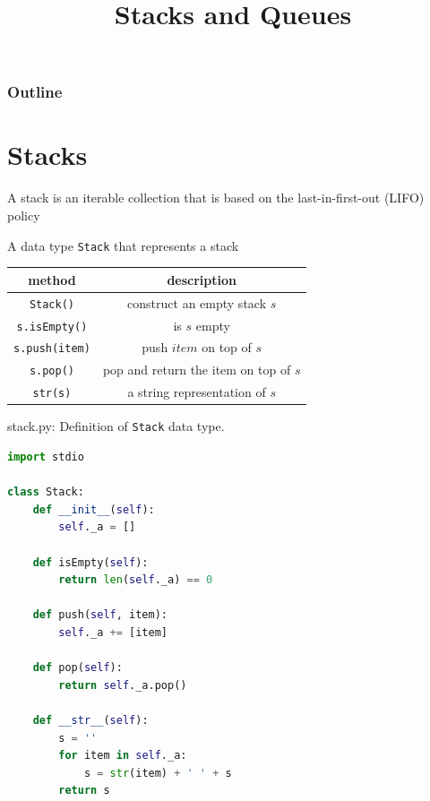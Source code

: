 \documentclass[8pt,a4paper,compress]{beamer}
\title{Stacks and Queues}
\date{}
\begin{document}
\begin{frame}
\vfill
\titlepage
\end{frame}

\begin{frame}
\frametitle{Outline}
\tableofcontents
\end{frame}

\section{Stacks}
\begin{frame}[fragile]
\pause

A stack is an iterable collection that is based on the last-in-first-out (LIFO) policy

\pause
\bigskip

A data type \lstinline{Stack} that represents a stack
\begin{center}
\begin{tabular}{cc}
method & description \\ \hline
\lstinline$Stack()$ & construct an empty stack $s$ \\
\lstinline$s.isEmpty()$ & is $s$ empty \\
\lstinline$s.push(item)$ & push $item$ on top of $s$ \\
\lstinline$s.pop()$ &  pop and return the item on top of $s$ \\
\lstinline$str(s)$ & a string representation of $s$
\end{tabular} 
\end{center}
\end{frame}

\begin{frame}[fragile]
\pause

\begin{framed}
\tiny stack.py: Definition of \lstinline{Stack} data type.
\end{framed}

\begin{lstlisting}[language=Python]
import stdio

class Stack:
    def __init__(self):
        self._a = []

    def isEmpty(self):
        return len(self._a) == 0

    def push(self, item):
        self._a += [item]

    def pop(self):
        return self._a.pop()

    def __str__(self):
        s = ''
        for item in self._a:
            s = str(item) + ' ' + s
        return s
\end{lstlisting}
\end{frame}
\end{document}
